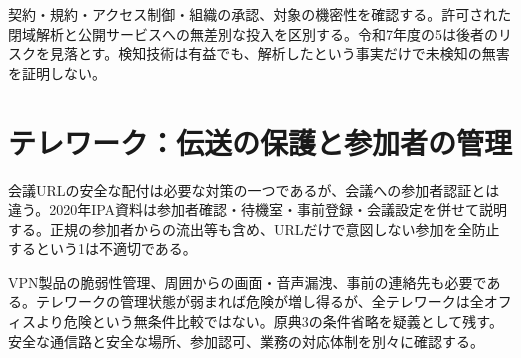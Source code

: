 契約・規約・アクセス制御・組織の承認、対象の機密性を確認する。許可された閉域解析と公開サービスへの無差別な投入を区別する。令和7年度の5は後者のリスクを見落とす。検知技術は有益でも、解析したという事実だけで未検知の無害を証明しない。

\section{テレワーク：伝送の保護と参加者の管理}
\label{theory:network:telework}
会議URLの安全な配付は必要な対策の一つであるが、会議への参加者認証とは違う。2020年IPA資料は参加者確認・待機室・事前登録・会議設定を併せて説明する\cite{net_meeting2020}。正規の参加者からの流出等も含め、URLだけで意図しない参加を全防止するという1は不適切である。

VPN製品の脆弱性管理、周囲からの画面・音声漏洩、事前の連絡先も必要である\cite{net_telework}。テレワークの管理状態が弱まれば危険が増し得るが、全テレワークは全オフィスより危険という無条件比較ではない。原典3の条件省略を疑義として残す。安全な通信路と安全な場所、参加認可、業務の対応体制を別々に確認する。





